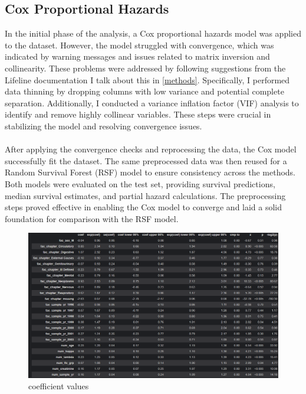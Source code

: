 \subsection{Cox Proportional Hazards}
In the initial phase of the analysis, a Cox proportional hazards model was applied to the dataset. However, the model struggled with convergence, which was indicated by warning messages and issues related to matrix inversion and collinearity. These problems were addressed by following suggestions from the Lifeline documentation I talk about this in \ref{methods}. Specifically, I performed data thinning by dropping columns with low variance and potential complete separation. Additionally, I conducted a variance inflation factor (VIF) analysis to identify and remove highly collinear variables. These steps were crucial in stabilizing the model and resolving convergence issues.
\\\\
\noindent After applying the convergence checks and reprocessing the data, the Cox model successfully fit the dataset. The same preprocessed data was then reused for a Random Survival Forest (RSF) model to ensure consistency across the methods. Both models were evaluated on the test set, providing survival predictions, median survival estimates, and partial hazard calculations. The preprocessing steps proved effective in enabling the Cox model to converge and laid a solid foundation for comparison with the RSF model.



\begin{figure}[h]
    \centering
    \includegraphics[width=\linewidth]{Figures/SURV/covariates.png}
    \caption{coefficient values}
    \label{fig:your_label}
\end{figure}

